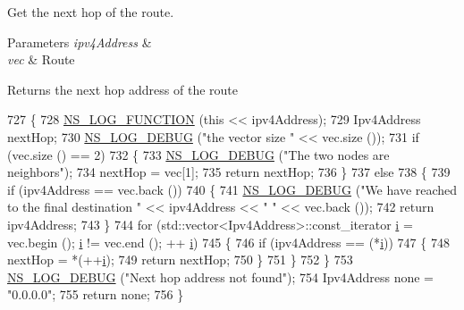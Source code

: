 Get the next hop of the route. 


\begin{DoxyParams}{Parameters}
{\em ipv4\+Address} & \\
\hline
{\em vec} & Route \\
\hline
\end{DoxyParams}
\begin{DoxyReturn}{Returns}
the next hop address of the route 
\end{DoxyReturn}

\begin{DoxyCode}
727 \{
728   \hyperlink{log-macros-disabled_8h_a90b90d5bad1f39cb1b64923ea94c0761}{NS\_LOG\_FUNCTION} (\textcolor{keyword}{this} << ipv4Address);
729   Ipv4Address nextHop;
730   \hyperlink{group__logging_ga413f1886406d49f59a6a0a89b77b4d0a}{NS\_LOG\_DEBUG} (\textcolor{stringliteral}{"the vector size "} << vec.size ());
731   \textcolor{keywordflow}{if} (vec.size () == 2)
732     \{
733       \hyperlink{group__logging_ga413f1886406d49f59a6a0a89b77b4d0a}{NS\_LOG\_DEBUG} (\textcolor{stringliteral}{"The two nodes are neighbors"});
734       nextHop = vec[1];
735       \textcolor{keywordflow}{return} nextHop;
736     \}
737   \textcolor{keywordflow}{else}
738     \{
739       \textcolor{keywordflow}{if} (ipv4Address == vec.back ())
740         \{
741           \hyperlink{group__logging_ga413f1886406d49f59a6a0a89b77b4d0a}{NS\_LOG\_DEBUG} (\textcolor{stringliteral}{"We have reached to the final destination "} << ipv4Address << \textcolor{stringliteral}{" "} << 
      vec.back ());
742           \textcolor{keywordflow}{return} ipv4Address;
743         \}
744       \textcolor{keywordflow}{for} (std::vector<Ipv4Address>::const\_iterator \hyperlink{bernuolliDistribution_8m_a6f6ccfcf58b31cb6412107d9d5281426}{i} = vec.begin (); \hyperlink{bernuolliDistribution_8m_a6f6ccfcf58b31cb6412107d9d5281426}{i} != vec.end (); ++
      \hyperlink{bernuolliDistribution_8m_a6f6ccfcf58b31cb6412107d9d5281426}{i})
745         \{
746           \textcolor{keywordflow}{if} (ipv4Address == (*\hyperlink{bernuolliDistribution_8m_a6f6ccfcf58b31cb6412107d9d5281426}{i}))
747             \{
748               nextHop = *(++\hyperlink{bernuolliDistribution_8m_a6f6ccfcf58b31cb6412107d9d5281426}{i});
749               \textcolor{keywordflow}{return} nextHop;
750             \}
751         \}
752     \}
753   \hyperlink{group__logging_ga413f1886406d49f59a6a0a89b77b4d0a}{NS\_LOG\_DEBUG} (\textcolor{stringliteral}{"Next hop address not found"});
754   Ipv4Address none = \textcolor{stringliteral}{"0.0.0.0"};
755   \textcolor{keywordflow}{return} none;
756 \}
\end{DoxyCode}


